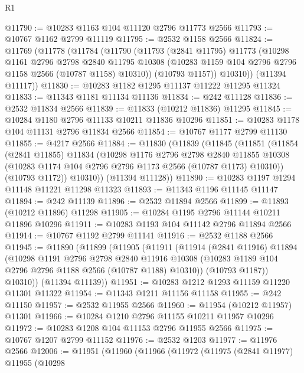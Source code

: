 \begin{lexlean}{R1}
\begin{coremodule}
@11790 := @10283 @1163 @104 @11120 @2796 @11773 @2566
@11793 := @10767 @1162 @2799 @11119
@11795 := @2532 @1158 @2566
@11824 := @11769
    (@11778
      (@11784
        (@11790
          (@11793
            (@2841 @11795)
            @11773
            (@10298
              @1161
              @2796
              @2798
              @2840
              @11795
              @10308
              (@10283 @1159 @104 @2796 @2796 @1158 @2566 (@10787 @1158) @10310))
            (@10793 @1157))
          @10310))
      (@11394 @11117))
@11830 := @10283 @1182 @1295 @11137 @11222 @11295 @11324
@11833 := @11343 @1181 @11134 @11136
@11834 := @242 @11128
@11836 := @2532 @11834 @2566
@11839 := @11833 (@10212 @11836) @11295
@11845 := @10284 @1180 @2796 @11133 @10211 @11836 @10296
@11851 := @10283 @1178 @104 @11131 @2796 @11834 @2566
@11854 := @10767 @1177 @2799 @11130
@11855 := @4217 @2566
@11884 := @11830
    (@11839
      (@11845
        (@11851
          (@11854
            (@2841 @11855)
            @11834
            (@10298
              @1176
              @2796
              @2798
              @2840
              @11855
              @10308
              (@10283 @1174 @104 @2796 @2796 @1173 @2566 (@10787 @1173) @10310))
            (@10793 @1172))
          @10310))
      (@11394 @11128))
@11890 := @10283 @1197 @1294 @11148 @11221 @11298 @11323
@11893 := @11343 @1196 @11145 @11147
@11894 := @242 @11139
@11896 := @2532 @11894 @2566
@11899 := @11893 (@10212 @11896) @11298
@11905 := @10284 @1195 @2796 @11144 @10211 @11896 @10296
@11911 := @10283 @1193 @104 @11142 @2796 @11894 @2566
@11914 := @10767 @1192 @2799 @11141
@11916 := @2532 @1188 @2566
@11945 := @11890
    (@11899
      (@11905
        (@11911
          (@11914
            (@2841 @11916)
            @11894
            (@10298
              @1191
              @2796
              @2798
              @2840
              @11916
              @10308
              (@10283 @1189 @104 @2796 @2796 @1188 @2566 (@10787 @1188) @10310))
            (@10793 @1187))
          @10310))
      (@11394 @11139))
@11951 := @10283 @1212 @1293 @11159 @11220 @11301 @11322
@11954 := @11343 @1211 @11156 @11158
@11955 := @242 @11150
@11957 := @2532 @11955 @2566
@11960 := @11954 (@10212 @11957) @11301
@11966 := @10284 @1210 @2796 @11155 @10211 @11957 @10296
@11972 := @10283 @1208 @104 @11153 @2796 @11955 @2566
@11975 := @10767 @1207 @2799 @11152
@11976 := @2532 @1203
@11977 := @11976 @2566
@12006 := @11951
    (@11960
      (@11966
        (@11972
          (@11975
            (@2841 @11977)
            @11955
            (@10298

\end{coremodule}
\end{lexlean}
